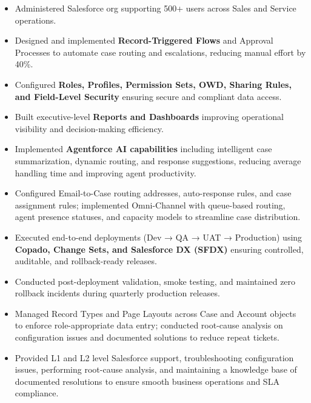 \documentclass[11pt,a4paper]{article}
\begin{document}
\begin{itemize}

\item Administered Salesforce org supporting 500+ users across Sales and Service operations.

\item Designed and implemented \textbf{Record-Triggered Flows} and Approval Processes to automate case routing and escalations, reducing manual effort by 40\%.

\item Configured \textbf{Roles, Profiles, Permission Sets, OWD, Sharing Rules, and Field-Level Security} ensuring secure and compliant data access.

\item Built executive-level \textbf{Reports and Dashboards} improving operational visibility and decision-making efficiency.

\item Implemented \textbf{Agentforce AI capabilities} including intelligent case summarization, dynamic routing, and response suggestions, reducing average handling time and improving agent productivity.

\item Configured Email-to-Case routing addresses, auto-response rules, and case assignment rules; implemented Omni-Channel with queue-based routing, agent presence statuses, and capacity models to streamline case distribution.

\item Executed end-to-end deployments (Dev → QA → UAT → Production) using \textbf{Copado, Change Sets, and Salesforce DX (SFDX)} ensuring controlled, auditable, and rollback-ready releases.

\item Conducted post-deployment validation, smoke testing, and maintained zero rollback incidents during quarterly production releases.

\item Managed Record Types and Page Layouts across Case and Account objects to enforce role-appropriate data entry; conducted root-cause analysis on configuration issues and documented solutions to reduce repeat tickets.



\item Provided L1 and L2 level Salesforce support, troubleshooting configuration issues, performing root-cause analysis, and maintaining a knowledge base of documented resolutions to ensure smooth business operations and SLA compliance.

\end{itemize}
\end{document}
